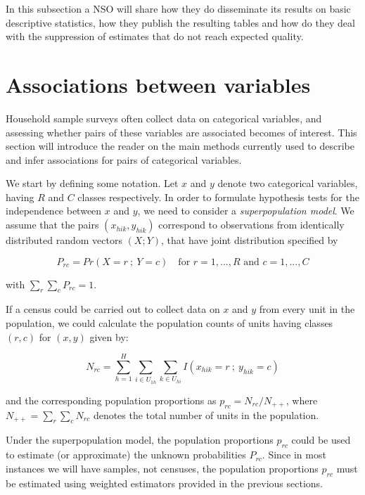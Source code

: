 \documentclass[
  12pt,
]{book}
\begin{document}
In this subsection a NSO will share how they do disseminate its results on basic descriptive statistics, how they publish the resulting tables and how do they deal with the suppression of estimates that do not reach expected quality.

\hypertarget{associations-between-variables}{%
\chapter{Associations between variables}\label{associations-between-variables}}

Household sample surveys often collect data on categorical variables, and assessing whether pairs of these variables are associated becomes of interest. This section will introduce the reader on the main methods currently used to describe and infer associations for pairs of categorical variables.

We start by defining some notation. Let \(x\) and \(y\) denote two categorical variables, having \(R\) and \(C\) classes respectively. In order to formulate hypothesis tests for the independence between \(x\) and \(y\), we need to consider a \emph{superpopulation model}. We assume that the pairs \((x_{hik} , y_{hik})\) correspond to observations from identically distributed random vectors \((X ; Y)\), that have joint distribution specified by

\[
P_{rc} = Pr \left( X = r \ ; \ Y = c \right) \quad \text{for } r=1,...,R \text{ and } c=1,...,C
\]

with \(\sum_r \sum_c P_{rc} = 1\).

If a census could be carried out to collect data on \(x\) and \(y\) from every unit in the population, we could calculate the population counts of units having classes \((r,c)\) for \((x,y)\) given by:

\[
N_{rc} = \sum_{h=1}^H \sum_{i \in U_{1h}} \sum_{k \in U_{hi}} I \left( x_{hik} = r \ ; \ y_{hik} = c \right)
\]

and the corresponding population proportions as \(p_{rc} = N_{rc} / N_{++}\), where \(N_{++} = \sum_r \sum_c N_{rc}\) denotes the total number of units in the population.

Under the superpopulation model, the population proportions \(p_{rc}\) could be used to estimate (or approximate) the unknown probabilities \(P_{rc}\). Since in most instances we will have samples, not censuses, the population proportions \(p_{rc}\) must be estimated using weighted estimators provided in the previous sections.
\end{document}
